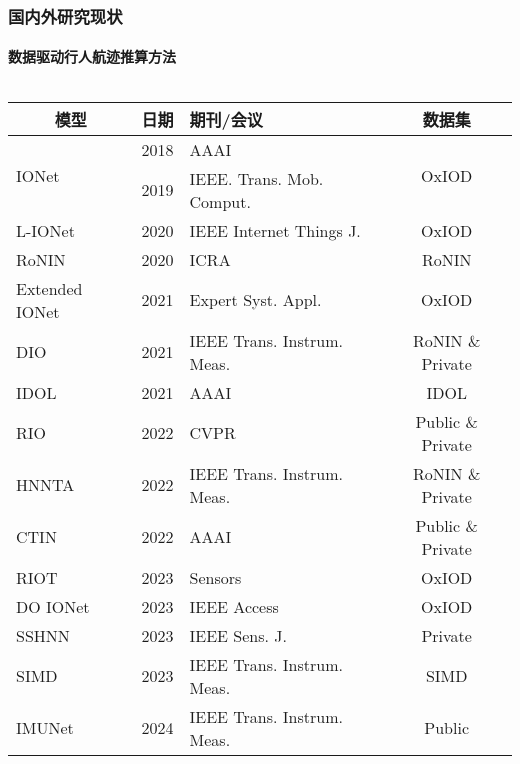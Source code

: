\begin{frame}
	\frametitle{国内外研究现状}
	\framesubtitle{数据驱动行人航迹推算方法}
	\vspace{-0.5cm}
	\begin{columns}[t]
		\begin{column}{0.5\textwidth}
		{
		    \tiny
		    \setlength{\tabcolsep}{2pt}
			\begin{tabular*}{\textwidth}{@{\extracolsep{\fill}}lclc}
				\toprule
				\multicolumn{1}{c}{模型} & 日期 & 期刊/会议 & 数据集 \\
				\midrule
				\multirow{2}{*}{IONet} & 2018 & AAAI                            & \multirow{2}{*}{OxIOD} \\
				                       & 2019 & IEEE. Trans. Mob. Comput.       &                        \\
				               L-IONet & 2020 & IEEE Internet Things J.         & OxIOD                  \\
				                 RoNIN & 2020 & ICRA                            & RoNIN                  \\
				        Extended IONet & 2021 & Expert Syst. Appl.              & OxIOD                  \\ 
				                   DIO & 2021 & IEEE Trans. Instrum. Meas.      & RoNIN \& Private       \\
				                  IDOL & 2021 & AAAI                            & IDOL                   \\
				                   RIO & 2022 & CVPR                            & Public \& Private      \\
				                 HNNTA & 2022 & IEEE Trans. Instrum. Meas.      & RoNIN \& Private       \\
				                  CTIN & 2022 & AAAI                            & Public \& Private      \\
				                  RIOT & 2023 & Sensors                         & OxIOD                  \\
				              DO IONet & 2023 & IEEE Access                     & OxIOD                  \\
				                 SSHNN & 2023 & IEEE Sens. J.                   & Private                \\
				                  SIMD & 2023 & IEEE Trans. Instrum. Meas.      & SIMD                   \\
				                IMUNet & 2024 & IEEE Trans. Instrum. Meas.      & Public                 \\

\end{tabular*}}
\end{column}
\end{columns}
\end{frame}
